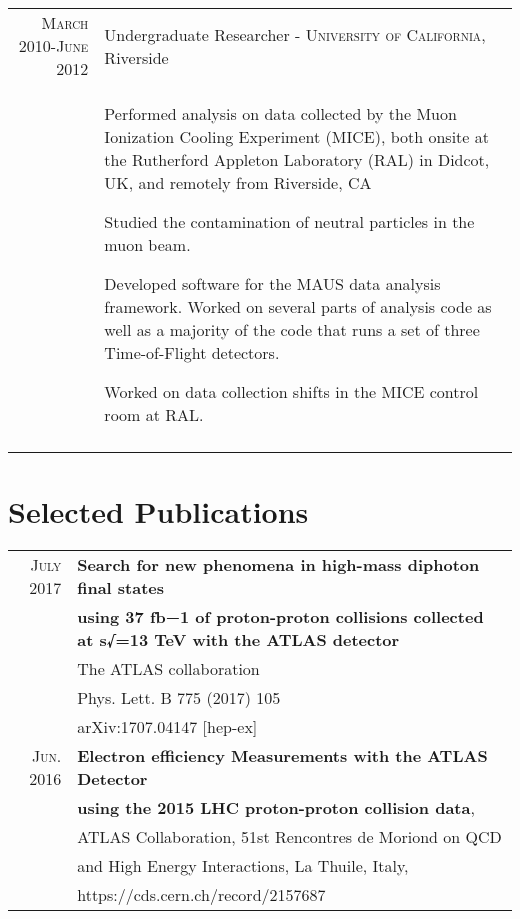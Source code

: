\documentclass[a4paper,10pt]{article} %
\begin{document}
\begin{longtable}{r|p{11cm}}
\pagebreak
\textsc{March 2010-June 2012} & Undergraduate Researcher - \textsc{University of California}, Riverside \emph{}\\
				  & \begin{itemize}
					\footnotesize{
						\item Performed analysis on data collected by the Muon Ionization Cooling Experiment (MICE), both onsite at the Rutherford Appleton Laboratory (RAL) in Didcot, UK, and remotely from Riverside, CA
						\item Studied the contamination of neutral particles in the muon beam.
					  \item Developed software for the MAUS data analysis framework.  Worked on several parts of analysis code as well as a majority of the code that runs a set of three Time-of-Flight detectors.
						\item Worked on data collection shifts in the MICE control room at RAL.
					}
			        \end{itemize} \\
\multicolumn{2}{c}{} \\


\end{longtable}


\section{Selected Publications}

\begin{tabular}{rl}
\textsc{July} 2017 & \textbf{Search for new phenomena in high-mass diphoton final states}\\
									 & \textbf{using 37 fb−1 of proton-proton collisions collected at s√=13 TeV with the ATLAS detector}\\
									 & The ATLAS collaboration  \\
									 & Phys. Lett. B 775 (2017) 105 \\
									 & arXiv:1707.04147 [hep-ex]  \\
\textsc{Jun.} 2016 & \textbf{Electron efficiency Measurements with the ATLAS Detector} \\
									& \textbf{using the 2015 LHC proton-proton collision data}, \\
									& ATLAS Collaboration, 51st Rencontres de Moriond on QCD \\
									& and High Energy Interactions, La Thuile, Italy, \\
									& https://cds.cern.ch/record/2157687 \\

\end{tabular}
\vspace{3mm}
\end{document}
